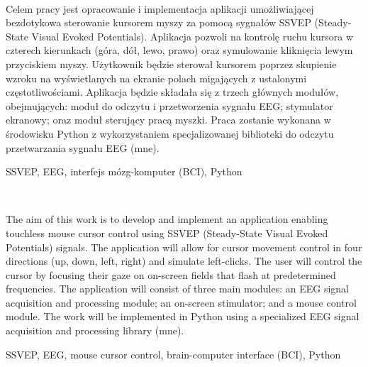 %


\begin{center}
\\[1cm] 
\end{center}

Celem pracy jest opracowanie i implementacja aplikacji umożliwiającej bezdotykowa sterowanie kursorem myszy za pomocą sygnałów SSVEP (Steady-State Visual Evoked Potentials). Aplikacja pozwoli na kontrolę ruchu kursora w czterech kierunkach (góra, dół, lewo, prawo) oraz symulowanie kliknięcia lewym przyciskiem myszy. Użytkownik będzie sterował kursorem poprzez skupienie wzroku na wyświetlanych na ekranie polach migających z ustalonymi częstotliwościami. Aplikacja będzie składała się z trzech głównych modułów, obejmujących: moduł do odczytu i przetworzenia sygnału EEG; stymulator ekranowy; oraz moduł sterujący pracą myszki. Praca zostanie wykonana w środowisku Python z wykorzystaniem specjalizowanej biblioteki do odczytu przetwarzania sygnału EEG (mne).

\vspace{10pt}
 SSVEP, EEG, interfejs mózg-komputer (BCI), Python

\vfill

\begin{center}
\\[1cm] 
\end{center}
The aim of this work is to develop and implement an application enabling touchless mouse cursor control using SSVEP (Steady-State Visual Evoked Potentials) signals. The application will allow for cursor movement control in four directions (up, down, left, right) and simulate left-clicks. The user will control the cursor by focusing their gaze on on-screen fields that flash at predetermined frequencies. The application will consist of three main modules: an EEG signal acquisition and processing module; an on-screen stimulator; and a mouse control module. The work will be implemented in Python using a specialized EEG signal acquisition and processing library (mne).


\vspace{10pt}
 SSVEP, EEG, mouse cursor control, brain-computer interface (BCI), Python